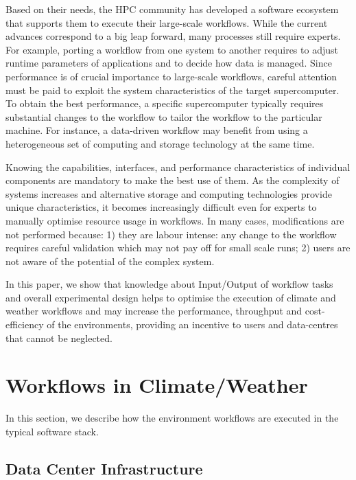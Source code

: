 \documentclass[a4paper]{article}
\newcommand{\jk}[1]{\todo[inline]{JK: #1}}
\begin{document}
Based on their needs, the HPC community has developed a software ecosystem that supports them to execute their large-scale workflows.
While the current advances correspond to a big leap forward, many processes still require experts.
For example, porting a workflow from one system to another requires to adjust runtime parameters of applications and to decide how data is managed.
Since performance is of crucial importance to large-scale workflows, careful attention must be paid to exploit the system characteristics of the target supercomputer.
To obtain the best performance, a specific supercomputer typically requires substantial changes to the workflow to tailor the workflow to the particular machine.
For instance, a data-driven workflow may benefit from using a heterogeneous set of computing and storage technology at the same time.

Knowing the capabilities, interfaces, and performance characteristics of individual components are mandatory to make the best use of them.
As the complexity of systems increases and alternative storage and computing technologies provide unique characteristics, it becomes increasingly difficult even for experts to manually optimise resource usage in workflows. In many cases, modifications are not performed because: 1) they are labour intense: any change to the workflow requires careful validation which may not pay off for small scale runs; 2) users are not aware of the potential of the complex system.

In this paper, we show that knowledge about Input/Output of workflow tasks and overall experimental design helps to
optimise the execution of climate and weather workflows and may increase the performance, throughput and cost-efficiency of the environments, providing an incentive to users and data-centres that cannot be neglected.


\jk{TODO}


\section{Workflows in Climate/Weather}
\label{sec:workflows}

In this section, we describe how the environment workflows are executed in the typical software stack.

\subsection{Data Center Infrastructure}
\end{document}
